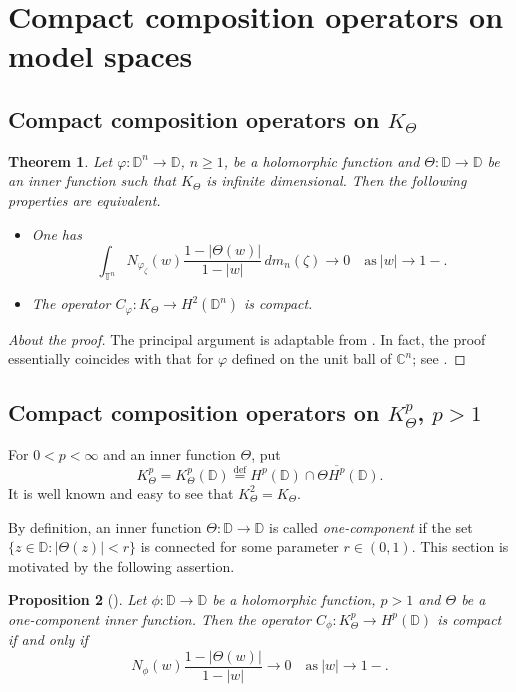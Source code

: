 \documentclass{amsart}
\numberwithin{equation}{section}
\newtheorem{theorem}{Theorem}[section]
\newtheorem{proposition}[theorem]{Proposition}
\theoremstyle{definition}
\newcommand{\neva}{N}
\newcommand{\bneva}{\mathcal{N}}
\newcommand{\meal}{m_n}
\newcommand{\diin}{\Theta}
\newcommand{\za}{\zeta}
\newcommand{\ph}{\varphi}
\newcommand{\cph}{C_\varphi}
\newcommand{\Dbb}{\mathbb D}
\newcommand{\tn}{\mathbb{T}^n}
\newcommand{\dn}{\mathbb{D}^n}
\begin{document}
\section{Compact composition operators on model spaces}\label{s_KT}

\subsection{Compact composition operators on $K_\diin$}

\begin{theorem}\label{t_cph_tri}
Let $\ph: \dn\to\Dbb$, $n\ge 1$, be a holomorphic function and $\diin: \Dbb \to \Dbb$ be an inner function
such that $K_\diin$ is infinite dimensional.
Then the following properties are equivalent.
\begin{itemize}
  \item [(i)] One has
  \begin{equation}\label{e_nevaTo0}
\int_{\tn}\neva_{\ph_\za}(w) \frac{1-|\diin(w)|}{1-|w|}\, d\meal(\za)\to 0 \quad \textrm{as}\ |w|\to 1-.
\end{equation}
  \item [(ii)] The operator $\cph: K_\diin \to H^2(\dn)$ is compact.
\end{itemize}
\end{theorem}
\begin{proof}[About the proof]
The principal argument is adaptable from \cite{ShJoel87}.
In fact, the proof essentially coincides with that for $\ph$ defined on the unit ball of $\mathbb{C}^n$;
see \cite{Dou25}.
\end{proof}

\subsection{Compact composition operators on $K_\diin^p$, $p>1$}\label{s_KTp}

For $0<p<\infty$ and an inner function $\diin$, put
\[
K^p_\diin = K^p_\diin(\Dbb) \overset{\mathrm{def}}= H^p(\Dbb) \cap \diin \overline{H^p}(\Dbb).
\]
It is well known and easy to see that $K^2_\diin = K_\diin$.

By definition, an inner function $\diin: \Dbb \to \Dbb$ is called \textit{one-component} if the set
$\{z\in\Dbb: |\diin(z)|< r\}$ is connected for some parameter $r\in (0,1)$.
This section is motivated by the following assertion.

\begin{proposition}[{\cite[Section~4]{LM13}}]\label{p_BaLM}
Let $\phi: \Dbb\to\Dbb$ be a holomorphic function, $p>1$ and $\diin$ be a one-component inner function.
Then the operator $C_\phi: K^p_\diin \to H^p(\Dbb)$ is compact if and only if
\[
\neva_{\phi}(w) \frac{1-|\diin(w)|}{1-|w|} \to 0 \quad \textrm{as}\ |w|\to 1-.
\]
\end{proposition}
\end{document}
